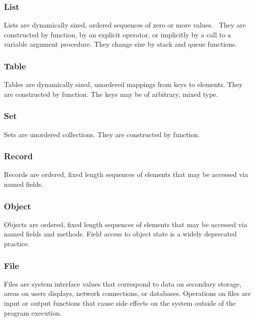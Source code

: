 \subsubsection{List}

Lists are dynamically sized, ordered sequences of zero or
more values. \ They are constructed by function, by an explicit
operator, or implicitly by a call to a variable argument procedure.
They change size by stack and queue
functions.

\subsubsection{Table}

Tables are dynamically sized, unordered mappings from keys
to elements. They are constructed by function. The keys may be of
arbitrary, mixed type.

\subsubsection{Set}

Sets are unordered collections. They are constructed by
function.

\subsubsection{Record}

Records are ordered, fixed length sequences of elements
that may be accessed via named fields.

\subsubsection{Object}

Objects are ordered, fixed length sequences of elements
that may be accessed via named fields and methods. Field access to
object state is a widely deprecated practice.

\subsubsection[File]{File}

Files are system interface values that correspond to data on
secondary storage, areas on users{\textquotesingle} displays, network
connections, or databases. Operations on files are
input or output functions that cause side effects on the system outside
of the program execution.

